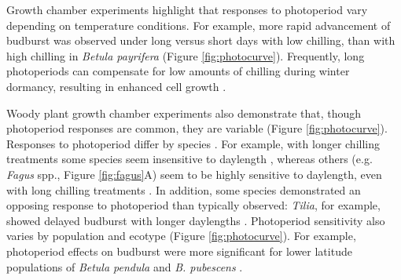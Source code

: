 \documentclass{article}
\begin{document}
\par Growth chamber experiments highlight that responses to photoperiod vary depending on temperature conditions. For example, more rapid advancement of budburst was observed under long versus short days with low chilling, than with high chilling in \emph{Betula payrifera} \citep{Hawkins:2012} (Figure \ref{fig:photocurve}). %
Frequently, long photoperiods can compensate for low amounts of chilling during winter dormancy, resulting in enhanced cell growth \citep{Heide:1993,Myking:1995,Caffarra:2011b}.%
\par Woody plant growth chamber experiments also demonstrate that, though photoperiod responses are common, they are variable (Figure \ref{fig:photocurve}). Responses to photoperiod differ by species \citep[e.g.,][]{Heide:1993a,Howe:1996,Basler:2012, Basler:2014aa,zohner2016,flynn2018}.
For example, with longer chilling treatments some species seem insensitive to daylength \citep[e.g., \emph{Hammamelis} spp., \emph{Prunus} spp.][]{zohner2016}, %
whereas others (e.g. \emph{Fagus} spp., Figure \ref{fig:fagus}A) seem to be highly sensitive to daylength, even with long chilling treatments \citep{zohner2016}. In addition, some species demonstrated an opposing response to photoperiod than typically observed: \emph{Tilia}, for example, showed delayed budburst with longer daylengths \citep[Figure \ref{fig:photocurve},][]{Ashby:1962aa}. %
Photoperiod sensitivity also varies by population and ecotype \citep[e.g.,][]{Partanen:2005aa} (Figure \ref{fig:photocurve}). For example, photoperiod effects on budburst were more significant for lower latitude populations of \emph{Betula pendula} and \emph{B. pubescens} \citep{Partanen:2005aa}. 
\end{document}

